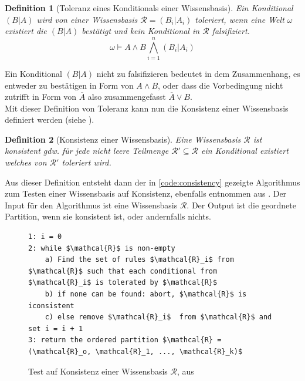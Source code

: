 \documentclass[12pt,a4paper]{article}
\newtheorem{theorem}{Definition}
\begin{document}
\begin{theorem}[Toleranz eines Konditionals einer Wissensbasis]
\label{def:toleranz}
Ein Konditional $(B|A)$ wird von einer Wissensbasis $\mathcal{R} = {(B_i|A_i)}$ toleriert, wenn eine Welt $\omega$ existiert die $(B|A)$ bestätigt und kein Konditional in $\mathcal{R}$ falsifiziert.
\begin{equation}
\omega \models A \wedge B \bigwedge^n_{i=1}(B_i|A_i)
\end{equation}
\end{theorem}
Ein Konditional $(B|A)$ nicht zu falsifizieren bedeutet in dem Zusammenhang, es entweder zu bestätigen in Form von $A \wedge B$, oder dass die Vorbedingung nicht zutrifft in Form von $\overline{A}$ also zusammengefasst $\overline{A} \vee B$. \\
Mit dieser Definition von Toleranz kann nun die Konsistenz einer Wissensbasis definiert werden (siehe \cite{goldszmidt96}).
\begin{theorem}[Konsistenz einer Wissensbasis]
\label{def:konsistenz}
Eine Wissensbasis $\mathcal{R}$ ist konsistent gdw. für jede nicht leere Teilmenge $\mathcal{R}' \subseteq \mathcal{R}$ ein Konditional existiert welches von $\mathcal{R}'$ toleriert wird.
\end{theorem}
Aus dieser Definition entsteht dann der in \autoref{code:consistency} gezeigte Algorithmus zum Testen einer Wissensbasis auf Konsistenz, ebenfalls entnommen aus \cite{goldszmidt96}. Der Input für den Algorithmus ist eine Wissensbasis $\mathcal{R}$. Der Output ist die geordnete Partition, wenn sie konsistent ist, oder andernfalls nichts.


\begin{figure}[h]
\begin{lstlisting}[mathescape=true]
1: i = 0
2: while $\mathcal{R}$ is non-empty
	a) Find the set of rules $\mathcal{R}_i$ from $\mathcal{R}$ such that each conditional from $\mathcal{R}_i$ is tolerated by $\mathcal{R}$
	b) if none can be found: abort, $\mathcal{R}$ is iconsistent
	c) else remove $\mathcal{R}_i$  from $\mathcal{R}$ and set i = i + 1
3: return the ordered partition $\mathcal{R} = (\mathcal{R}_o, \mathcal{R}_1, ..., \mathcal{R}_k)$
\end{lstlisting}

\caption{Test auf Konsistenz einer Wissensbasis $\mathcal{R}$, aus \cite{goldszmidt96}}
\label{code:consistency}

\end{figure}
\end{document}
